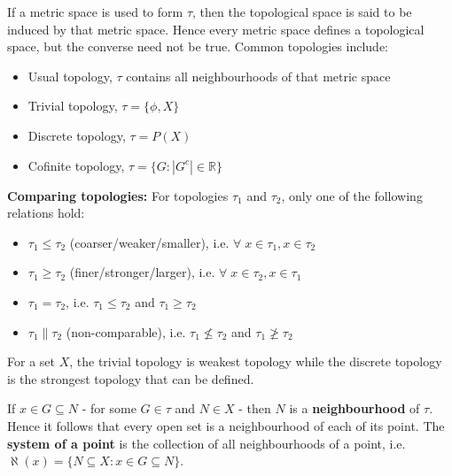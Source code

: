 \documentclass{article}
\begin{document}
If a metric space is used to form $\tau$, then the topological space is said to be induced by that metric space. Hence every metric space defines a topological space, but the converse need not be true. Common topologies include:
\begin{itemize}
	\item Usual topology, $\tau$ contains all neighbourhoods of that metric space
	\item Trivial topology, $\tau = \{\phi, X\}$
	\item Discrete topology, $\tau = P(X)$
	\item Cofinite topology, $\tau = \{G: |G^c| \in \mathbb{R}\}$
\end{itemize}

\textbf{Comparing topologies:} For topologies $\tau_1$ and $\tau_2$, only one of the following relations hold:
\begin{itemize}
	\item $\tau_1 \leq \tau_2$ (coarser/weaker/smaller), i.e. $\forall \; x \in \tau_1, x \in \tau_2$
	\item $\tau_1 \geq \tau_2$ (finer/stronger/larger), i.e. $\forall \; x \in \tau_2, x \in \tau_1$
	\item $\tau_1 = \tau_2$, i.e. $\tau_1 \leq \tau_2$ and $\tau_1 \geq \tau_2$
	\item $\tau_1 \parallel \tau_2$ (non-comparable), i.e. $\tau_1 \not\leq \tau_2$ and $\tau_1 \not\geq \tau_2$	
\end{itemize}
For a set $X$, the trivial topology is weakest topology while the discrete topology is the strongest topology that can be defined.

If $x \in G \subseteq N$ - for some $G \in \tau$ and $N \in X$ - then $N$ is a \textbf{neighbourhood} of $\tau$. Hence it follows that every open set is a neighbourhood of each of its point. The \textbf{system of a point} is the collection of all neighbourhoods of a point, i.e. $\aleph(x) = \{N \subseteq X: x \in G \subseteq N\}$. \\
\end{document}
